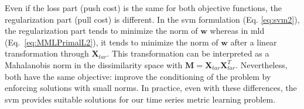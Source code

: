 \indent Even if the loss part (push cost) is the same for both objective functions, the regularization part (pull cost) is different. In the {\sc svm} formulation (Eq. \ref{eq:svm2}), the regularization part tends to minimize the norm of $\textbf{w}$ whereas in {\sc mld} (Eq.~\ref{eq:MMLPrimalL2}), it tends to minimize the norm of $\textbf{w}$ after a linear transformation through $\textbf{X}_{tar}$. This transformation can be interpreted as a Mahalanobis norm in the dissimilarity space with $\textbf{M}=\textbf{X}_{tar}\textbf{X}_{tar}^T$. Nevertheless, both have the same objective: improve the conditioning of the problem by enforcing solutions with small norms. In practice, even with these differences, the {\sc svm} provides suitable solutions for our time series metric learning problem. \\


